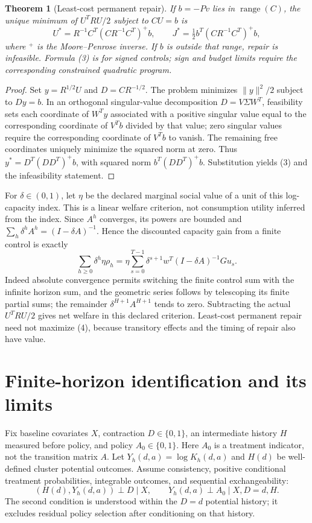 \documentclass[11pt]{article}
\newtheorem{theorem}{Theorem}
\theoremstyle{remark}
\newcommand{\range}{\operatorname{range}}
\begin{document}
\begin{theorem}[Least-cost permanent repair]
If $b=-Pv$ lies in $\range(C)$, the unique minimum of $U^TRU/2$ subject
to $CU=b$ is
\[
 U^*=R^{-1}C^T(CR^{-1}C^T)^+b,\qquad
 J^*=\tfrac12 b^T(CR^{-1}C^T)^+b,                                    \tag{3}
\]
where $^+$ is the Moore--Penrose inverse. If $b$ is outside that range,
repair is infeasible. Formula (3) is for signed controls; sign and budget
limits require the corresponding constrained quadratic program.
\end{theorem}
\begin{proof}
Set $y=R^{1/2}U$ and $D=CR^{-1/2}$. The problem minimizes
$\|y\|^2/2$ subject to $Dy=b$. In an orthogonal singular-value
decomposition $D=V\Sigma W^T$, feasibility sets each coordinate of
$W^Ty$ associated with a positive singular value equal to the corresponding
coordinate of $V^Tb$ divided by that value; zero singular values require
the corresponding coordinate of $V^Tb$ to vanish. The remaining free
coordinates uniquely minimize the squared norm at zero. Thus
$y^*=D^T(DD^T)^+b$, with squared norm $b^T(DD^T)^+b$.
Substitution yields (3) and the infeasibility statement.
\end{proof}

For $\delta\in(0,1)$, let $\eta$ be the declared marginal social value
of a unit of this log-capacity index. This is a linear welfare criterion,
not consumption utility inferred from the index. Since $A^h$ converges,
its powers are bounded and $\sum_h\delta^hA^h=(I-\delta A)^{-1}$.
Hence the discounted capacity gain from a finite control is exactly
\[
 \sum_{h\geq0}\delta^h\eta\rho_h
 =\eta\sum_{s=0}^{T-1}\delta^{s+1}
 w^T(I-\delta A)^{-1}Gu_s.                                         \tag{4}
\]
Indeed absolute convergence permits switching the finite control sum with
the infinite horizon sum, and the geometric series follows by telescoping
its finite partial sums; the remainder $\delta^{H+1}A^{H+1}$ tends to
zero. Subtracting the actual $U^TRU/2$ gives net welfare in this declared
criterion. Least-cost permanent repair need not maximize (4), because
transitory effects and the timing of repair also have value.

\section{Finite-horizon identification and its limits}
Fix baseline covariates $X$, contraction $D\in\{0,1\}$, an intermediate
history $H$ measured before policy, and policy $A_0\in\{0,1\}$.
Here $A_0$ is a treatment indicator, not the transition matrix $A$.
Let $Y_h(d,a)=\log K_h(d,a)$ and $H(d)$ be well-defined cluster
potential outcomes. Assume consistency, positive conditional treatment
probabilities, integrable outcomes, and sequential exchangeability:
\[
 (H(d),Y_h(d,a))\perp D\mid X,\qquad
 Y_h(d,a)\perp A_0\mid X,D=d,H.
\]
The second condition is understood within the $D=d$ potential history;
it excludes residual policy selection after conditioning on that history.
\end{document}
